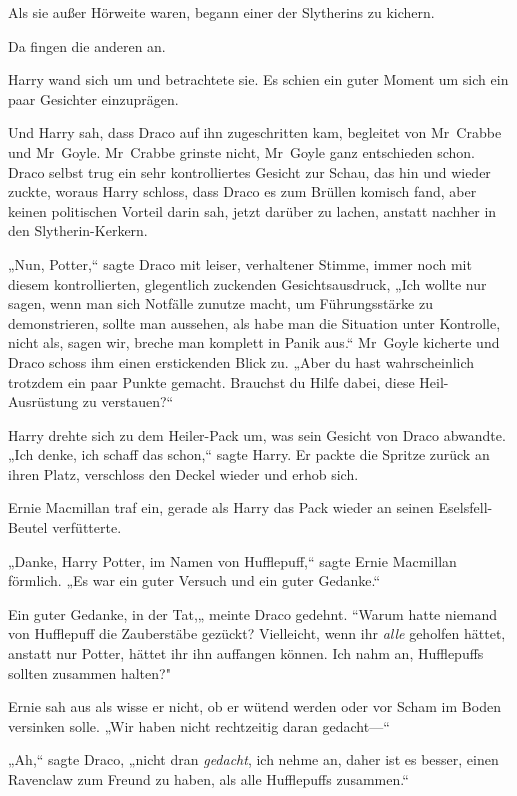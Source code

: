 {Als sie außer Hörweite waren, begann einer der Slytherins zu kichern.

Da fingen die anderen an.

Harry wand sich um und betrachtete sie. Es schien ein guter Moment um sich ein paar Gesichter einzuprägen.

Und Harry sah, dass Draco auf ihn zugeschritten kam, begleitet von Mr~Crabbe und Mr~Goyle. Mr~Crabbe grinste nicht, Mr~Goyle ganz entschieden schon. Draco selbst trug ein sehr kontrolliertes Gesicht zur Schau, das hin und wieder zuckte, woraus Harry schloss, dass Draco es zum Brüllen komisch fand, aber keinen politischen Vorteil darin sah, jetzt darüber zu lachen, anstatt nachher in den Slytherin-Kerkern.

„Nun, Potter,“ sagte Draco mit leiser, verhaltener Stimme, immer noch mit diesem kontrollierten, glegentlich zuckenden Gesichtsausdruck, „Ich wollte nur sagen, wenn man sich Notfälle zunutze macht, um Führungsstärke zu demonstrieren, sollte man aussehen, als habe man die Situation unter Kontrolle, nicht als, sagen wir, breche man komplett in Panik aus.“ Mr~Goyle kicherte und Draco schoss ihm einen erstickenden Blick zu. „Aber du hast wahrscheinlich trotzdem ein paar Punkte gemacht. Brauchst du Hilfe dabei, diese Heil-Ausrüstung zu verstauen?“

Harry drehte sich zu dem Heiler-Pack um, was sein Gesicht von Draco abwandte. „Ich denke, ich schaff das schon,“ sagte Harry. Er packte die Spritze zurück an ihren Platz, verschloss den Deckel wieder und erhob sich.

Ernie Macmillan traf ein, gerade als Harry das Pack wieder an seinen Eselsfell-Beutel verfütterte.

„Danke, Harry Potter, im Namen von Hufflepuff,“ sagte Ernie Macmillan förmlich. „Es war ein guter Versuch und ein guter Gedanke.“

Ein guter Gedanke, in der Tat,„ meinte Draco gedehnt. “Warum hatte niemand von Hufflepuff die Zauberstäbe gezückt? Vielleicht, wenn ihr \emph{alle} geholfen hättet, anstatt nur Potter, hättet ihr ihn auffangen können. Ich nahm an, Hufflepuffs sollten zusammen halten?"

Ernie sah aus als wisse er nicht, ob er wütend werden oder vor Scham im Boden versinken solle. „Wir haben nicht rechtzeitig daran gedacht—“

„Ah,“ sagte Draco, „nicht dran \emph{gedacht}, ich nehme an, daher ist es besser, einen Ravenclaw zum Freund zu haben, als alle Hufflepuffs zusammen.“

}
